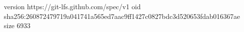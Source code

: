version https://git-lfs.github.com/spec/v1
oid sha256:260872479719a041741a565ed7aac9ff1427c0827bdc3d520653fdab016367ae
size 6933
